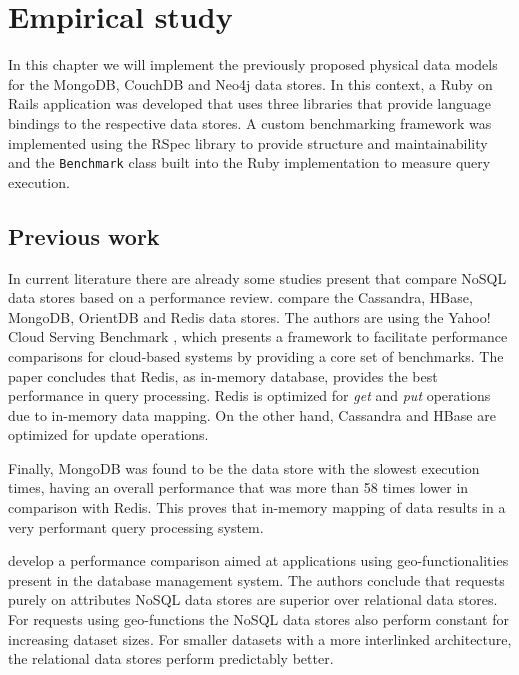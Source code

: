 \chapter{Empirical study}
\label{ch:empirical-study}

In this chapter we will implement the previously proposed physical data models for the MongoDB, CouchDB and Neo4j data stores.
In this context, a Ruby on Rails application was developed that uses three libraries that provide language bindings to the respective data stores.
A custom benchmarking framework was implemented using the RSpec library to provide structure and maintainability and the \texttt{Benchmark} class built into the Ruby implementation to measure query execution.


\section{Previous work}
\label{sec:previous-work}


In current literature there are already some studies present that compare NoSQL data stores based on a performance review.
\textcite{Abramova2014} compare the Cassandra, HBase, MongoDB, OrientDB and Redis data stores.
The authors are using the Yahoo! Cloud Serving Benchmark \autocite{Cooper2010}, which presents a framework to facilitate performance comparisons for cloud-based systems by providing a core set of benchmarks.
The paper concludes that Redis, as in-memory database, provides the best performance in query processing.
Redis is optimized for \textit{get} and \textit{put} operations due to in-memory data mapping.
On the other hand, Cassandra and HBase are optimized for update operations.

Finally, MongoDB was found to be the data store with the slowest execution times, having an overall performance that was more than 58 times lower in comparison with Redis.
This proves that in-memory mapping of data results in a very performant query processing system.

\textcite{Schmid2015} develop a performance comparison aimed at applications using geo-functionalities present in the database management system.
The authors conclude that requests purely on attributes NoSQL data stores are superior over relational data stores.
For requests using geo-functions the NoSQL data stores also perform constant for increasing dataset sizes.
For smaller datasets with a more interlinked architecture, the relational data stores perform predictably better.

